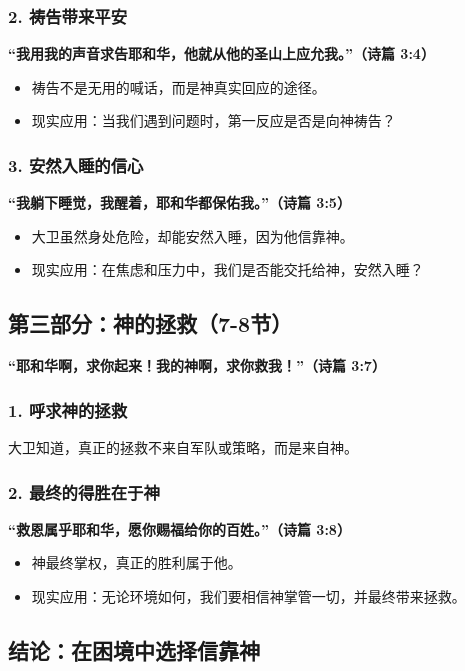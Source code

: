 \documentclass[a4paper, 12pt]{article}
\begin{document}
\subsubsection*{2. 祷告带来平安}
\textbf{“我用我的声音求告耶和华，他就从他的圣山上应允我。”（诗篇 3:4）}

\begin{itemize}
    \item 祷告不是无用的喊话，而是神真实回应的途径。
    \item 现实应用：当我们遇到问题时，第一反应是否是向神祷告？
\end{itemize}

\subsubsection*{3. 安然入睡的信心}
\textbf{“我躺下睡觉，我醒着，耶和华都保佑我。”（诗篇 3:5）}

\begin{itemize}
    \item 大卫虽然身处危险，却能安然入睡，因为他信靠神。
    \item 现实应用：在焦虑和压力中，我们是否能交托给神，安然入睡？
\end{itemize}

\subsection*{第三部分：神的拯救（7-8节）}

\textbf{“耶和华啊，求你起来！我的神啊，求你救我！”（诗篇 3:7）}

\subsubsection*{1. 呼求神的拯救}
大卫知道，真正的拯救不来自军队或策略，而是来自神。

\subsubsection*{2. 最终的得胜在于神}
\textbf{“救恩属乎耶和华，愿你赐福给你的百姓。”（诗篇 3:8）}

\begin{itemize}
    \item 神最终掌权，真正的胜利属于他。
    \item 现实应用：无论环境如何，我们要相信神掌管一切，并最终带来拯救。
\end{itemize}

\subsection*{结论：在困境中选择信靠神}
\end{document}
